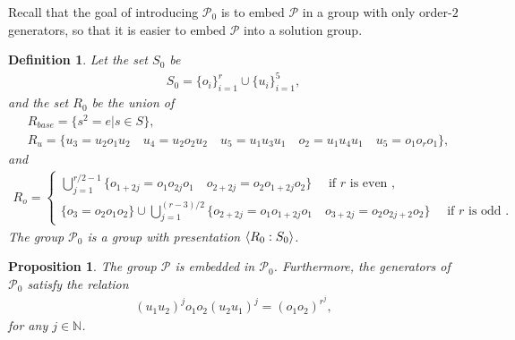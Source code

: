 \documentclass[11pt,letterpaper]{article}
\DeclarePairedDelimiter{\ip}{\langle}{\rangle}
\newcommand{\N}{\mathbb{N}}
\newcommand{\1}{\mathbb{1}}
\newcommand{\Pg}{\mathcal{P}}
\newtheorem{proposition}[theorem]{Proposition}
\newtheorem{definition}[theorem]{Definition}
\theoremstyle{definition}
\begin{document}
Recall that the goal of introducing $\Pg_0$ is to embed
$\Pg$ in a group with only order-$2$ generators,
so that it is easier to embed $\Pg$ into a solution group.
\begin{definition}	
\label{def:g0}
	Let the set $S_0$ be 
	\begin{align*}
		S_0 = \{o_i\}_{i=1}^{r} \cup \{u_i\}_{i=1}^5,
	\end{align*}
	and the set $R_0$ be the union of 
	\begin{align*}
	&R_{base} = \{s^2 = e | s \in S\},\\
	&R_{u} = \{ u_3 = u_2o_1u_2 \quad u_4 = u_2o_2u_2 \quad 
	u_5 = u_1u_3u_1 \quad o_2 = u_1u_4u_1 \quad u_5 = o_1 o_r o_1\},
	\end{align*}
	and 
	\begin{align*}
	R_o = 
	\begin{cases} 
	\bigcup_{j=1}^{r/2-1}\{ o_{1+2j} = o_1o_{2j}o_1 \quad o_{2+2j} = o_2o_{1+2j}o_2\} \quad \text{ if $r$ is even },\\
	\{o_3 = o_2o_1o_2\} \cup \bigcup_{j=1}^{(r-3)/2}\{
	 o_{2+2j} =o_1o_{1+2j}o_1 \quad o_{3+2j} = o_2o_{2j+2}o_2 \}\quad\text{ if $r$ is odd }.
	\end{cases}
	\end{align*}
	The group $\Pg_0$ is a group with presentation $\ip{R_0:S_0}$.
\end{definition}
\begin{proposition}
    \label{prop:g0}
	The group $\Pg$ is embedded in $\Pg_0$.
	Furthermore, the generators of $\Pg_0$ satisfy the relation 
	\begin{align}
	    \label{eq:uo_rel}
		(u_1u_2)^j o_1o_2 (u_2u_1)^j = (o_1o_2)^{r^j}, 
	\end{align}
	for any $ j \in \N$.
\end{proposition}
\end{document}
